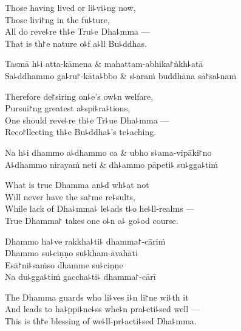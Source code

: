 \begin{english}
  Those having lived or li꜕vi꜕ng now,\\
  Those livi꜓ng in the fu꜕ture,\\
  All do reve꜕re th꜕e Tru꜕e Dha꜕mma ---\\
  That is th꜓e nature o꜕f a꜕ll Bu꜕ddhas.
\end{english}

\begin{twochants}
  Tasmā h꜕i atta-kāmena & mahattam-abhika꜓ṅkh꜕atā \\
  Sa꜕ddhammo ga꜕ru꜓-kāta꜕bbo & s꜕araṁ buddhāna sā꜓sa꜕naṁ \\
\end{twochants}

\begin{english}
  Therefore de꜓siring on꜕e's ow꜕n welfare,\\
  Pursui꜓ng greatest a꜕spi꜕ra꜕tions,\\
  One should reve꜕re th꜕e Tr꜕ue Dha꜕mma ---\\
  Reco꜓llecting th꜕e Bu꜕ddha꜕'s te꜕aching.
\end{english}

\clearpage

\begin{twochants}
  Na h꜕i dhammo a꜕dhammo ca & ubho s꜕ama-vipāki꜓no \\
  A꜕dhammo nirayaṁ neti & dh꜕ammo pāpeti꜕ su꜕gga꜕tiṁ \\
\end{twochants}

\begin{english}
  What is true Dhamma an꜕d wh꜕at not\\
  Will never have the sa꜓me re꜕sults,\\
  While lack of Dha꜕mma꜕ le꜕ads t꜕o he꜕ll-realms ---\\
  True Dhamma꜓ takes one o꜕n a꜕ go꜕od course.
\end{english}

Dhammo ha꜕ve rakkha꜕ti꜕ dhamma꜓-cāriṁ\\
Dhammo su꜕ciṇṇo su꜕kham-āvahāti\\
Esā꜓ni꜕saṁso dhamme su꜕ciṇṇe\\
Na du꜕gga꜕tiṁ gaccha꜕ti꜕ dhamma꜓-cārī

\begin{english}
  The Dhamma guards who li꜕ves i꜕n li꜓ne wi꜕th it\\
  And leads to ha꜕ppi꜕ne꜕ss whe꜕n pra꜕cti꜕sed well ---\\
  This is th꜓e blessing of we꜕ll-pr꜕acti꜕sed Dha꜕mma.
\end{english}

